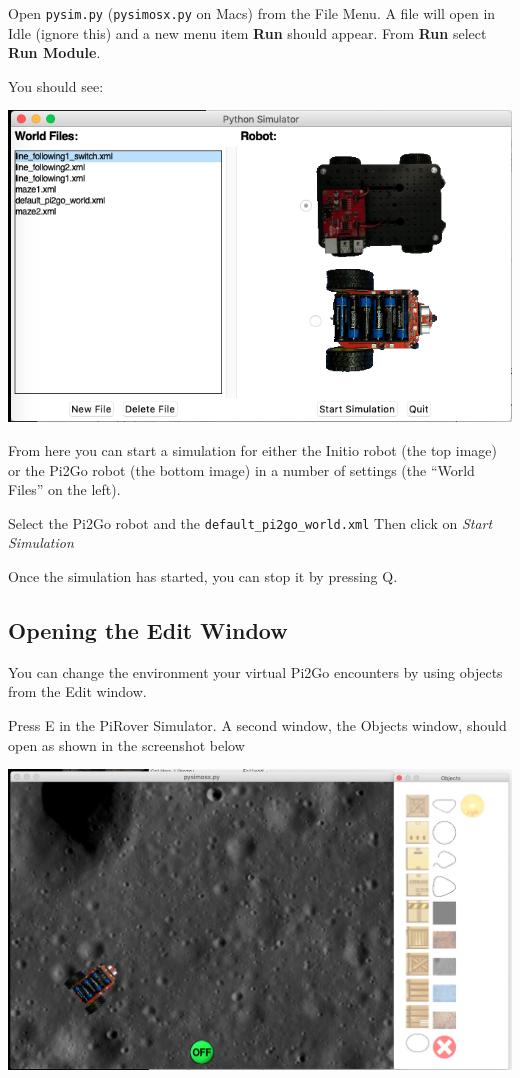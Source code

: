 \documentclass[a4,12pt]{article}
\begin{document}
Open \lstinline{pysim.py} (\lstinline{pysimosx.py} on Macs) from the File Menu.   A file will open in Idle (ignore this) and a new menu item {\bf Run} should appear.   From {\bf Run}  select {\bf Run Module}.

You should see:

\begin{center}
  \includegraphics[width=14cm]{images/opening.png}
\end{center}

From here you can start a simulation for either the Initio robot (the top image) or the Pi2Go robot (the bottom image) in a number of settings (the “World Files” on the left).  

Select the Pi2Go robot and the \lstinline{default_pi2go_world.xml}
Then click on \emph{Start Simulation}

Once the simulation has started, you can stop it by pressing Q.

\subsection{Opening the Edit Window}

You can change the environment your virtual Pi2Go encounters by using objects from the Edit window.

Press E in the PiRover Simulator.  A second window, the Objects window, should open as shown in the screenshot below

\begin{center}
  \includegraphics[width=14cm]{images/edit.png}
\end{center}
\end{document}
